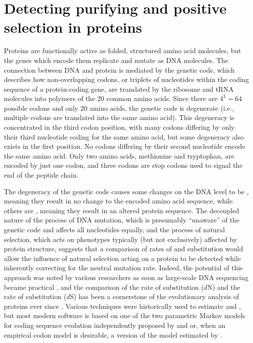 \section{Detecting purifying and positive selection in proteins}
\label{section_codon_models}

Proteins are functionally active as folded, structured amino acid
molecules, but the genes which encode them replicate and mutate as DNA
molecules. The connection between DNA and protein is mediated by the
genetic code, which describes how non-overlapping codons, or triplets
of nucleotides within the coding sequence of a protein-coding gene,
are translated by the ribosome and tRNA molecules into polymers of the
20 common amino acids. Since there are $4^3=64$ possible codons and
only 20 amino acids, the genetic code is degenerate (i.e., multiple
codons are translated into the same amino acid). This degeneracy is
concentrated in the third codon position, with many codons differing
by only their third nucleotide coding for the same amino acid, but
some degeneracy also exists in the first position. No codons differing
by their second nucleotide encode the same amino acid. Only two amino
acids, methionine and tryptophan, are encoded by just one codon, and
three codons are stop codons used to signal the end of the peptide
chain.

The degeneracy of the genetic code causes some changes on the DNA
level to be \syn, meaning they result in no change to the encoded
amino acid sequence, while others are \nsyn, meaning they result in an
altered protein sequence. The decoupled nature of the process of DNA
mutation, which is presumably ``unaware'' of the genetic code and
affects all nucleotides equally, and the process of natural selection,
which acts on phenotypes typically (but not exclusively) affected by
protein structure, suggests that a comparison of rates of \nsyn and
\syn substitution would allow the influence of natural selection
acting on a protein to be detected while inherently correcting for the
neutral mutation rate. Indeed, the potential of this approach was
noted by various researchers as soon as large-scale DNA sequencing
became practical \citep{Kimura1977,Jukes1979}, and the comparison of
the rate of \nsyn substitution ($d$N) and the rate of \syn
substitution ($d$S) has been a cornerstone of the evolutionary
analysis of proteins ever since \citep{Yang2006}. Various techniques
were historically used to estimate \dn and \ds \citep{Yang2000c}, but
most modern software is based on one of the two parametric Markov
models for coding sequence evolution independently proposed by
\citet{Goldman1994a} and \citet{Muse1994} or, when an empirical codon
model is desirable, a version of the model estimated by
\citet{Kosiol2007}.

